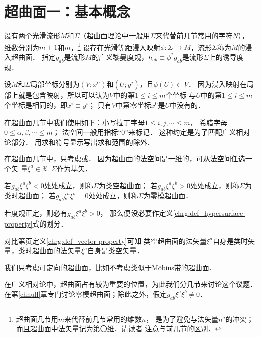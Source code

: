 
\section{超曲面一：基本概念}\label{chsm:sec_hypersurface-basic}
设有两个光滑流形$M$和$\Sigma$（超曲面理论中一般用$\Sigma$来代替前几节常用的字符$N$），
维数分别为$m+1$和$m$，{\footnote{超曲面几节用$m$来代替前几节常用的维数$n$，
        是为了避免与法矢量$n^a$的冲突；而且超曲面中法矢量记为第〇维．请读者
    注意与前几节的区别．}}
设存在光滑等距浸入映射$\phi:\Sigma\to M$，流形$\Sigma$称为$M$的{\heiti 浸入超曲面}．
指定$g_{ab}$是流形$M$的广义黎曼度规，$h_{ab}\equiv\phi^{*}g_{ab}$是流形$\Sigma$上的诱导度规．

设$M$和$\Sigma$局部坐标分别为$(V;x^\alpha)$和$(U;y^i)$，且$\phi(U)\subset V$．
因为浸入映射在局部上就是包含映射，所以可以认为$V$中的第$1 \leqslant i \leqslant m$个坐标
与$U$中的第$1 \leqslant i \leqslant m$个坐标是相同的，即$x^i\equiv y^i$；
只有$V$中第零坐标$x^0$是$U$中没有的．

{\kaishu
在超曲面几节中我们使用如下：小写拉丁字母$1 \leqslant i,j,\cdots \leqslant m$，
希腊字母$0 \leqslant \alpha,\beta,\cdots \leqslant m$；
法空间一般用指标“$0$”来标记． }
这种约定是为了匹配广义相对论部分．
用求和符号显示写出求和范围的除外．

在超曲面几节中，只考虑或．
因为超曲面的法空间是一维的，可从法空间任选一个矢
量$\xi^a\in \mathfrak{X}^\bot{\Sigma}$作为基矢．
\begin{definition}\label{chrg:def_hypersurface-property}
    若$g_{ab} \xi^a \xi^b<0$处处成立，则称$\Sigma$为{\heiti 类空超曲面}；
    若$g_{ab} \xi^a \xi^b>0$处处成立，则称$\Sigma$为{\heiti 类时超曲面}；
    若$g_{ab} \xi^a \xi^b=0$处处成立，则称$\Sigma$为{\heiti 零模超曲面}．
\end{definition}

若度规正定，则必有$g_{ab} \xi^a \xi^b>0$，
那么便没必要作定义\ref{chrg:def_hypersurface-property}式的划分．


对比第\pageref{chrg:def_vector-property}页定义\ref{chrg:def_vector-property}可知
类空超曲面的法矢量$\xi^a$自身是类时矢量，类时超曲面的法矢量$\xi^a$自身是类空矢量．


我们只考虑可定向的超曲面，比如不考虑类似于M\"{o}bius带的超曲面．


在广义相对论中，超曲面占有较为重要的位置，为此我们分几节来讨论这个议题．
在第\ref{chnull}章专门讨论零模超曲面；除此之外，假定$g_{ab}\xi^a\xi^b\neq 0$．


